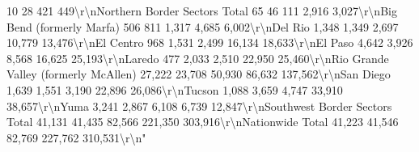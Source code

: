 \documentclass[
  12pt,
]{book}
\newenvironment{Shaded}{\begin{snugshade}}{\end{snugshade}}
\begin{document}
\begin{Shaded}
\begin{Highlighting}[]
10                   28              421               449\textbackslash{}r\textbackslash{}nNorthern Border Sectors Total                    65                       46                  111             2,916             3,027\textbackslash{}r\textbackslash{}nBig Bend (formerly Marfa)                       506                      811                 1,317           4,685              6,002\textbackslash{}r\textbackslash{}nDel Rio                                        1,348                    1,349                2,697           10,779             13,476\textbackslash{}r\textbackslash{}nEl Centro                                       968                     1,531                2,499           16,134             18,633\textbackslash{}r\textbackslash{}nEl Paso                                        4,642                    3,926                8,568           16,625             25,193\textbackslash{}r\textbackslash{}nLaredo                                          477                     2,033                2,510           22,950             25,460\textbackslash{}r\textbackslash{}nRio Grande Valley (formerly McAllen)          27,222                   23,708                50,930          86,632            137,562\textbackslash{}r\textbackslash{}nSan Diego                                      1,639                    1,551                3,190           22,896             26,086\textbackslash{}r\textbackslash{}nTucson                                         1,088                    3,659                4,747           33,910             38,657\textbackslash{}r\textbackslash{}nYuma                                           3,241                    2,867                6,108           6,739              12,847\textbackslash{}r\textbackslash{}nSouthwest Border Sectors Total                41,131                   41,435                82,566         221,350            303,916\textbackslash{}r\textbackslash{}nNationwide Total                              41,223                   41,546                82,769         227,762            310,531\textbackslash{}r\textbackslash{}n"                                                                                                                                                                                                                                                                                                                                                                                                                                                                                                                                                                                                                                                                                                                                                                                                                                                                                                                                                                                                                                                                                                                                                                                                                                       
\end{Highlighting}
\end{Shaded}
\end{document}
